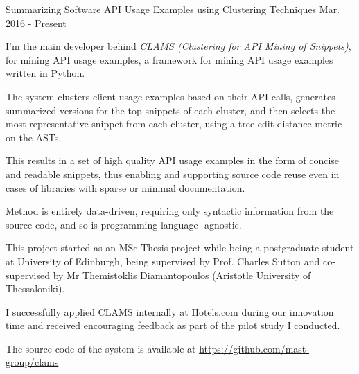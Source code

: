 

\begin{cventries}

  \cventry
    {Summarizing Software API Usage Examples using
Clustering Techniques} %
	{}
	{}
    {Mar. 2016 - Present} %
    {
      \begin{cvitems} %
        \item {I'm the main developer behind \textit{CLAMS (Clustering for API Mining of Snippets)}, for mining API usage examples, a framework for mining API usage examples written in Python.}
		\item {The system clusters client usage examples based on their API calls, generates summarized versions for the top snippets of each cluster, and then selects the most representative snippet from each cluster, using a tree edit distance metric on the ASTs.}
		\item {This results in a set of high quality API usage examples in the form of concise and readable snippets, thus enabling and supporting source code reuse even in cases of libraries with sparse or minimal documentation.}
		\item {Method is entirely data-driven, requiring only syntactic information from the source code, and so is programming language- agnostic.}
		\item {This project started as an MSc Thesis project while being a postgraduate student at University of Edinburgh, being supervised by Prof. Charles Sutton and co-supervised by Mr Themistoklis Diamantopoulos (Aristotle University of Thessaloniki).}
		\item {I successfully applied CLAMS internally at Hotels.com during our innovation time and received encouraging feedback as part of the pilot study I conducted.}
		\item {The source code of the system is available at \url{https://github.com/mast-group/clams}}
      \end{cvitems}
    }
    

\end{cventries}
